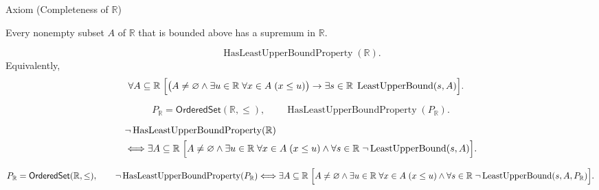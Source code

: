 \begin{axiombox}{Axiom (Completeness of $\mathbb{R}$)}
\begin{axiom}
\label{ax:completeness-of-reals}
Every nonempty subset $A$ of $\mathbb{R}$ that is bounded above has a
supremum in $\mathbb{R}$.
\end{axiom}
\end{axiombox}

\begin{remark*}
\[
\operatorname{HasLeastUpperBoundProperty}(\mathbb{R}).
\]
Equivalently,
\[
\begin{aligned}
&\forall A\subseteq\mathbb{R}\;
\Bigl[
\bigl(A\neq\varnothing \land \exists u\in\mathbb{R}\;\forall x\in A\;(x\le u)\bigr)
\rightarrow
\exists s\in\mathbb{R}\;\operatorname{LeastUpperBound}(s,A)
\Bigr].
\end{aligned}
\]
\end{remark*}

\begin{remark*}
\[
P_{\mathbb{R}}=\mathsf{OrderedSet}(\mathbb{R},\leq),\qquad
\operatorname{HasLeastUpperBoundProperty}(P_{\mathbb{R}}).
\]
\end{remark*}

\begin{remark*}
\[
\begin{aligned}
&\neg\operatorname{HasLeastUpperBoundProperty}(\mathbb{R})\\
&\Longleftrightarrow
\exists A\subseteq\mathbb{R}\;
\Bigl[
A\neq\varnothing
\land
\exists u\in\mathbb{R}\;\forall x\in A\;(x\le u)
\land
\forall s\in\mathbb{R}\;\neg\operatorname{LeastUpperBound}(s,A)
\Bigr].
\end{aligned}
\]
\end{remark*}

\begin{remark*}
\[
P_{\mathbb{R}}=\mathsf{OrderedSet}(\mathbb{R},\leq),\qquad
\neg\operatorname{HasLeastUpperBoundProperty}(P_{\mathbb{R}})\Longleftrightarrow
\exists A\subseteq\mathbb{R}\;
\Bigl[
A\neq\varnothing
\land
\exists u\in\mathbb{R}\;\forall x\in A\;(x\le u)
\land
\forall s\in\mathbb{R}\;\neg\operatorname{LeastUpperBound}(s,A,P_{\mathbb{R}})
\Bigr].
\]
\end{remark*}

